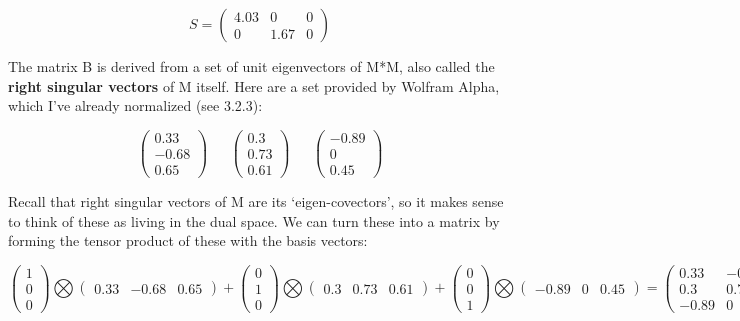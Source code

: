 \documentclass[oneside,english]{amsbook}
\numberwithin{section}{chapter}
\theoremstyle{plain}
\theoremstyle{definition}
\begin{document}
\[S = \begin{pmatrix}
	4.03 & 0 & 0 \\
	0 & 1.67 & 0
\end{pmatrix}\]

The matrix B is derived from a set of unit eigenvectors of M*M, also
called the \textbf{right singular vectors} of M itself. Here are a set
provided by Wolfram Alpha, which I've already normalized (see 3.2.3):

\[\begin{pmatrix}
	0.33 \\
	- 0.68 \\
	0.65
\end{pmatrix}\ \ \ \ \ \ \ \begin{pmatrix}
	0.3 \\
	0.73 \\
	0.61
\end{pmatrix}\ \ \ \ \ \ \ \begin{pmatrix}
	- 0.89 \\
	0 \\
	0.45
\end{pmatrix}\]

Recall that right singular vectors of M are its `eigen-covectors', so
it makes sense to think of these as living in the dual space. We can
turn these into a matrix by forming the tensor product of these with the
basis vectors:

\[\begin{pmatrix}
	1 \\
	0 \\
	0
\end{pmatrix}\bigotimes\begin{pmatrix}
	0.33 & - 0.68 & 0.65
\end{pmatrix} + \begin{pmatrix}
	0 \\
	1 \\
	0
\end{pmatrix}\bigotimes\begin{pmatrix}
	0.3 & 0.73 & 0.61
\end{pmatrix} + \begin{pmatrix}
	0 \\
	0 \\
	1
\end{pmatrix}\bigotimes\begin{pmatrix}
	- 0.89 & 0 & 0.45
\end{pmatrix} = \begin{pmatrix}
	0.33 & - 0.68 & 0.65 \\
	0.3 & 0.75 & 0.61 \\
	- 0.89 & 0 & 0.45
\end{pmatrix}\]
\end{document}
